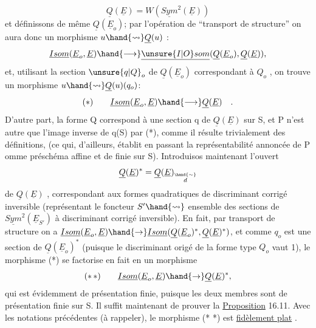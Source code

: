 
\[ \underline{Q}(\underline{E}) =W(\underline{Sym}^2(\underline{E})) \]
et définissons de même $\underline{Q}(\underline{E}_o)$; par l'opération de ``transport de
structure'' on aura donc un morphisme $u \hand{\rightsquigarrow} \underline{Q}(u)$ :
\[ \underline{Isom}(\underline{E}_o,\underline{E}) \hand{\longrightarrow} \underline{\unsure{I|O}som}(\underline{Q}(\underline{E}_o),\underline{Q}(\underline{E})), \]
et, utilisant la section $\unsure{q|Q}_o$ de $\underline{Q}(\underline{E}_o)$ correspondant à $Q_o$ , on trouve un
morphisme $u \hand{\rightsquigarrow} \underline{Q}(u)(q_o)$:
\[ (*) \qquad \underline{Isom}(\underline{E}_o,\underline{E}) \hand{\longrightarrow} \underline{Q}(\underline{E}) \quad . \]
D'autre part, la forme Q  correspond à une section q de $\underline{Q}(\underline{E})$ sur S,
et P n'est autre que l'image inverse de q(S) par (*), comme il résulte
trivialement des définitions, (ce qui, d'ailleurs, établit en passant la
représentabilité annoncée de P omme préschéma affine et de  finie
sur S). Introduisos maintenant l'ouvert 
\[ \underline{Q}(\underline{E})^* = \underline{Q}(\underline{E})_{\overset{\hand{\sim}}{d}} \]
de $\underline{Q}(\underline{E})$ , correspondant aux formes quadratiques de discriminant corrigé
inversible (représentant le foncteur $S' \hand{\rightsquigarrow}$ ensemble des 
sections de $\underline{Sym}^2(\underline{E}_{S'})$ à discriminant corrigé inversible). En fait,
par transport de structure on a $\underline{Isom}(\underline{E}_o,\underline{E}) \hand{\rightarrow} \underline{Isom}(\underline{Q}(\underline{E}_o)^*,\underline{Q}(\underline{E})^*)$, et
comme $q_o$ est une section de $\underline{Q}(\underline{E}_o)^*$ (puisque le discriminant origé de
la forme type $Q_o$ vaut 1), le morphisme (*) se factorise en fait en un
morphisme
\[ (*\,*) \qquad \underline{Isom}(\underline{E}_o,\underline{E}) \hand{\rightarrow} \underline{Q}(\underline{E})^* , \]
qui est évidemment de présentation finie, puisque les deux membres sont de
présentation finie sur S. Il suffit maintenant de prouver la
 \uline{Proposition} 16.11. Avec les notations précédentes (à rappeler),
le morphisme (* *) est \uline{fidèlement plat} .

